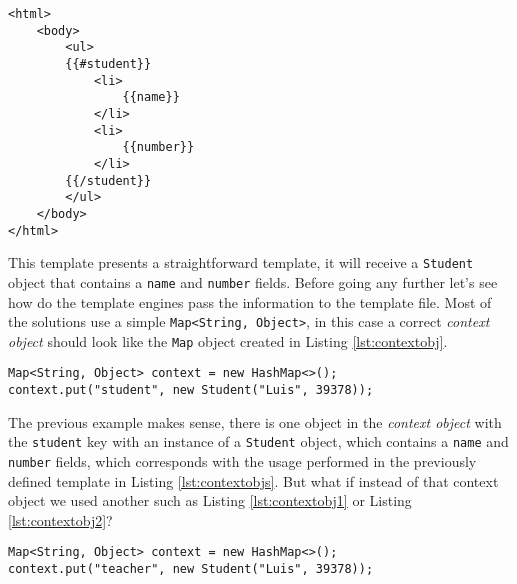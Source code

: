 \bigskip


\begin{minipage}{\linewidth}
\begin{lstlisting}[caption={Template with Placeholders}, label={lst:contextobjs}, style=problemex]
<html>
    <body>
        <ul>
        {{#student}}
            <li>
                {{name}}
            </li>
            <li>
                {{number}}
            </li>
        {{/student}}
        </ul>
    </body>
</html>
\end{lstlisting}
\end{minipage} 

\noindent
This template presents a straightforward template, it will receive a \texttt{Student} object that contains a \texttt{name} and \texttt{number} fields. Before going any further let's see how do the template engines pass the information to the template file. Most of the solutions use a simple \texttt{Map<String, Object>}, in this case a correct \textit{context object} should look like the \texttt{Map} object created in Listing \ref{lst:contextobj}.

\bigskip


\begin{minipage}{\linewidth}
\begin{lstlisting}[caption={Context Object 1}, label={lst:contextobj}]
Map<String, Object> context = new HashMap<>();
context.put("student", new Student("Luis", 39378));
\end{lstlisting}
\end{minipage} 

\noindent
The previous example makes sense, there is one object in the \textit{context object} with the \texttt{student} key with an instance of a \texttt{Student} object, which contains a \texttt{name} and \texttt{number} fields, which corresponds with the usage performed in the previously defined template in Listing \ref{lst:contextobjs}. But what if instead of that context object we used another such as Listing \ref{lst:contextobj1} or Listing \ref{lst:contextobj2}?

\bigskip


\begin{minipage}{\linewidth}
\begin{lstlisting}[caption={Context Object 2}, label={lst:contextobj1}]
Map<String, Object> context = new HashMap<>();
context.put("teacher", new Student("Luis", 39378));
\end{lstlisting}
\end{minipage} 

